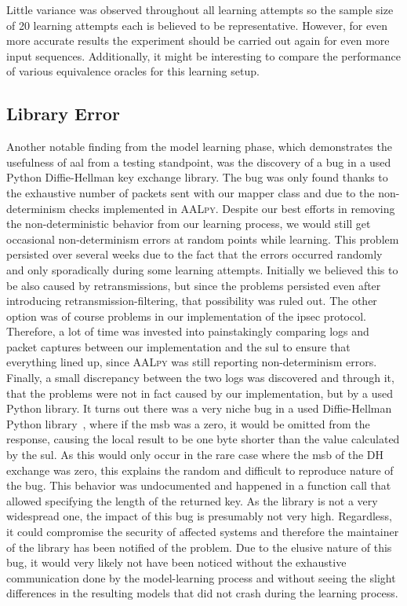 Little variance was observed throughout all learning attempts so the sample size of 20 learning attempts each is believed to be representative. However, for even more accurate results the experiment should be carried out again for even more input sequences. Additionally, it might be interesting to compare the performance of various equivalence oracles for this learning setup.

\subsection{Library Error} \label{subsec:liberror}
Another notable finding from the model learning phase, which demonstrates the usefulness of \ac{aal} from a testing standpoint, was the discovery of a bug in a used Python Diffie-Hellman key exchange library. The bug was only found thanks to the exhaustive number of packets sent with our mapper class and due to the non-determinism checks implemented in \textsc{AALpy}. Despite our best efforts in removing the non-deterministic behavior from our learning process, we would still get occasional non-determinism errors at random points while learning. This problem persisted over several weeks due to the fact that the errors occurred randomly and only sporadically during some learning attempts. Initially we believed this to be also caused by retransmissions, but since the problems persisted even after introducing retransmission-filtering, that possibility was ruled out. The other option was of course problems in our implementation of the \ac{ipsec} protocol. Therefore, a lot of time was invested into painstakingly comparing logs and packet captures between our implementation and the \ac{sul} to ensure that everything lined up, since \textsc{AALpy} was still reporting non-determinism errors. Finally, a small discrepancy between the two logs was discovered and through it, that the problems were not in fact caused by our implementation, but by a used Python library. It turns out there was a very niche bug in a used Diffie-Hellman Python library~\cite{topdappdh}, where if the \ac{msb} was a zero, it would be omitted from the response, causing the local result to be one byte shorter than the value calculated by the \ac{sul}. As this would only occur in the rare case where the \ac{msb} of the DH exchange was zero, this explains the random and difficult to reproduce nature of the bug. This behavior was undocumented and happened in a function call that allowed specifying the length of the returned key. As the library is not a very widespread one, the impact of this bug is presumably not very high. Regardless, it could compromise the security of affected systems and therefore the maintainer of the library has been notified of the problem. Due to the elusive nature of this bug, it would very likely not have been noticed without the exhaustive communication done by the model-learning process and without seeing the slight differences in the resulting models that did not crash during the learning process.
\newpage

